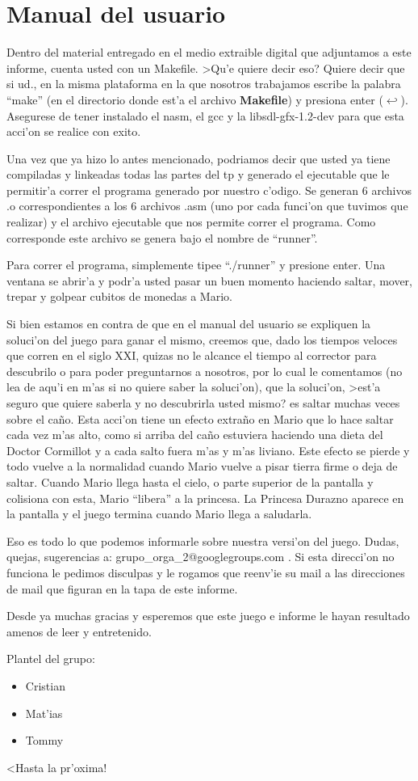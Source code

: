 \section{Manual del usuario}

	Dentro del material entregado en el medio extraible digital que adjuntamos a este informe, 
cuenta usted con un Makefile. >Qu'e quiere decir eso? Quiere decir que si ud., en la misma plataforma
en la que nosotros trabajamos escribe la palabra ``make'' (en el directorio donde est'a el archivo 
\textbf{Makefile}) y presiona enter ($\hookleftarrow$). Asegurese de tener instalado el nasm, el gcc y la libsdl-gfx-1.2-dev para que esta acci'on se realice con exito.

	Una vez que ya hizo lo antes mencionado, podriamos decir que usted ya tiene compiladas y linkeadas
todas las partes del tp y generado el ejecutable que le permitir'a correr el programa generado por nuestro 
c'odigo. Se generan 6 archivos .o correspondientes a los 6 archivos .asm (uno por cada funci'on que tuvimos 
que realizar) y el archivo ejecutable que nos permite correr el programa. Como corresponde este archivo se 
genera bajo el nombre de ``runner''.

	Para correr el programa, simplemente tipee ``./runner'' y presione enter. Una ventana se abrir'a y 
podr'a usted pasar un buen momento haciendo saltar, mover, trepar y golpear cubitos de monedas a Mario.

	Si bien estamos en contra de que en el manual del usuario se expliquen la soluci'on del juego para 
ganar el mismo, creemos que, dado los tiempos veloces que corren en el siglo XXI, quizas no le alcance el tiempo
al corrector para descubrilo o para poder preguntarnos a nosotros, por lo cual le comentamos (no lea de aqu'i 
en m'as si no quiere saber la soluci'on), que la soluci'on, >est'a seguro que quiere saberla y no descubrirla 
usted mismo? es saltar muchas veces sobre el caño. Esta acci'on tiene un efecto extraño en Mario que lo hace
saltar cada vez m'as alto, como si arriba del caño estuviera haciendo una dieta del Doctor Cormillot y a cada 
salto fuera m'as y m'as liviano. Este efecto se pierde y todo vuelve a la normalidad cuando Mario vuelve a 
pisar tierra firme o deja de saltar. Cuando Mario llega hasta el cielo, o parte superior de la pantalla y 
colisiona con esta, Mario ``libera'' a la princesa. La Princesa Durazno aparece en la pantalla y el juego termina
cuando Mario llega a saludarla.

	Eso es todo lo que podemos informarle sobre nuestra versi'on del juego. Dudas, quejas, sugerencias a: 
grupo\_orga\_2@googlegroups.com . Si esta direcci'on no funciona le pedimos disculpas y le rogamos que reenv'ie 
su mail a las direcciones de mail que figuran en la tapa de este informe. 

	Desde ya muchas gracias y esperemos que este juego e informe le hayan resultado amenos de leer y 
entretenido.

	Plantel del grupo:
\begin{itemize}
 \item Cristian
 \item Mat'ias
 \item Tommy
\end{itemize}

	<Hasta la pr'oxima!
